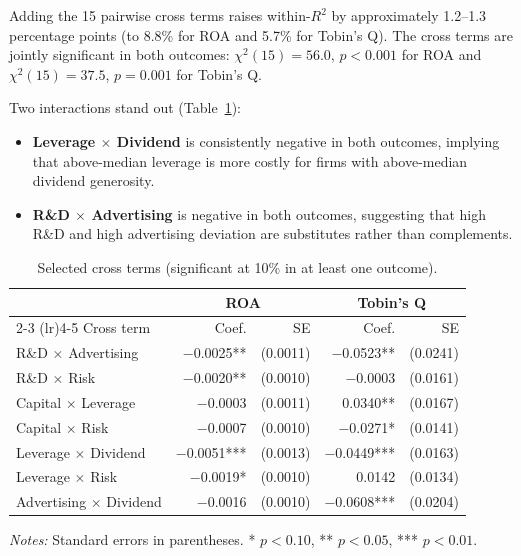 \documentclass[12pt]{article}
\begin{document}
Adding the 15 pairwise cross terms raises within-$R^2$ by approximately 1.2--1.3 percentage points (to 8.8\% for ROA and 5.7\% for Tobin's Q). The cross terms are jointly significant in both outcomes: $\chi^2(15) = 56.0$, $p < 0.001$ for ROA and $\chi^2(15) = 37.5$, $p = 0.001$ for Tobin's Q.

Two interactions stand out (Table~\ref{tab:cross_terms}):
\begin{itemize}
    \item \textbf{Leverage $\times$ Dividend} is consistently negative in both outcomes, implying that above-median leverage is more costly for firms with above-median dividend generosity.
    \item \textbf{R\&D $\times$ Advertising} is negative in both outcomes, suggesting that high R\&D and high advertising deviation are substitutes rather than complements.
\end{itemize}

\begin{table}[htbp]
\centering
\caption{Selected cross terms (significant at 10\% in at least one outcome).}
\label{tab:cross_terms}
\begin{tabular}{lrrrr}
\toprule
 & \multicolumn{2}{c}{ROA} & \multicolumn{2}{c}{Tobin's Q} \\
\cmidrule(lr){2-3} \cmidrule(lr){4-5}
Cross term & Coef. & SE & Coef. & SE \\
\midrule
R\&D $\times$ Advertising          & $-$0.0025**   & (0.0011) & $-$0.0523**   & (0.0241) \\
R\&D $\times$ Risk                 & $-$0.0020**   & (0.0010) & $-$0.0003     & (0.0161) \\
Capital $\times$ Leverage           & $-$0.0003     & (0.0011) &    0.0340**   & (0.0167) \\
Capital $\times$ Risk               & $-$0.0007     & (0.0010) & $-$0.0271*    & (0.0141) \\
Leverage $\times$ Dividend          & $-$0.0051***  & (0.0013) & $-$0.0449***  & (0.0163) \\
Leverage $\times$ Risk              & $-$0.0019*    & (0.0010) &    0.0142     & (0.0134) \\
Advertising $\times$ Dividend       & $-$0.0016     & (0.0010) & $-$0.0608***  & (0.0204) \\
\bottomrule
\end{tabular}

\smallskip
\footnotesize\textit{Notes:} Standard errors in parentheses. * $p < 0.10$, ** $p < 0.05$, *** $p < 0.01$.
\end{table}
\end{document}
